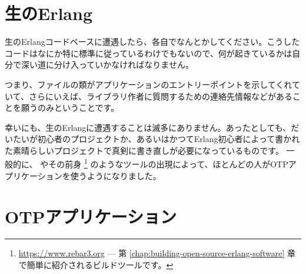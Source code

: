 \section{生のErlang}
\label{sec:dive-raw-erlang}

生のErlangコードベースに遭遇したら、各自でなんとかしてください。こうしたコードはなにか特に標準に従っているわけでもないので、何が起きているかは自分で深い道に分け入っていかなければなりません。

つまり、ファイルの類がアプリケーションのエントリーポイントを示してくれていて、さらにいえば、ライブラリ作者に質問するための連絡先情報などがあることを願うのみということです。

幸いにも、生のErlangに遭遇することは滅多にありません。あったとしても、だいたいが初心者のプロジェクトか、あるいはかつてErlang初心者によって書かれた素晴らしいプロジェクトで真剣に書き直しが必要になっているものです。
一般的に、  やその前身 \footnote{\href{https://www.rebar3.org}{https://www.rebar3.org} --- 第 \ref{chap:building-open-source-erlang-software} 章で簡単に紹介されるビルドツールです。} のようなツールの出現によって、ほとんどの人がOTPアプリケーションを使うようになりました。

\section{OTPアプリケーション}
\label{sec:dive-otp-applications}

